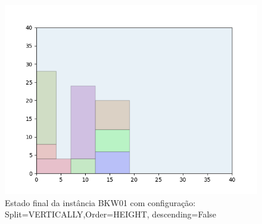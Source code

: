 \begin{figure}[H]
    \centering
    \caption[]{Estado final da instância BKW01 com configuração: Split=VERTICALLY,Order=HEIGHT, descending=False}
    \label{fig:bkw01-vertically-height-false}
    \includegraphics[scale=0.5]{output/figures/bkw/bkw01/vertically/height/false/00}
\end{figure}